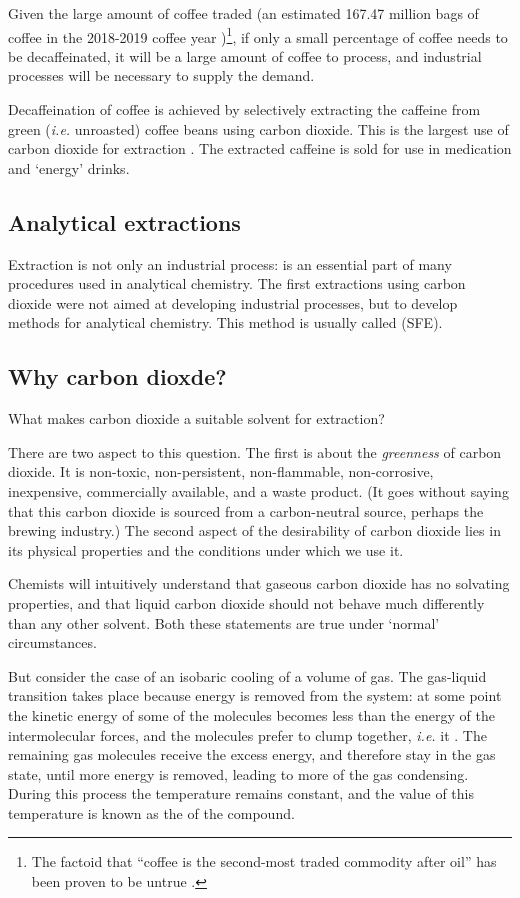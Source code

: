 Given the large amount of coffee traded (an estimated 167.47 million bags of
coffee in the 2018-2019 coffee year \autocite{Coffee2018})\footnote{The factoid
that ``coffee is the second-most traded commodity after oil'' has been proven to
be untrue \autocite{Greenberg2017}.}, if only a small percentage of coffee needs
to be decaffeinated, it will be a large amount of coffee to process, and
industrial processes will be necessary to supply the demand.

Decaffeination of coffee is achieved by selectively extracting the caffeine from
green (\textit{i.e.} unroasted) coffee beans using carbon dioxide. This is the
largest use of carbon dioxide for extraction \autocite{Ramalakshmi1999}. The
extracted caffeine is sold for use in medication and `energy' drinks.

\subsection{Analytical extractions}

Extraction is not only an industrial process: is an essential part of many
procedures used in analytical chemistry. The first extractions using carbon
dioxide were not aimed at developing industrial processes, but to develop
methods for analytical chemistry. This method is usually called
 (SFE).

\subsection{Why carbon dioxde?}

What makes carbon dioxide a suitable solvent for extraction?

There are two aspect to this question. The first is about the \textit{greenness}
of carbon dioxide. It is non-toxic, non-persistent, non-flammable,
non-corrosive, inexpensive, commercially available, and a waste product. (It
goes without saying that this carbon dioxide is sourced from a carbon-neutral
source, perhaps the brewing industry.) The second aspect of the desirability of
carbon dioxide lies in its physical properties and the conditions under which we
use it.

Chemists will intuitively understand that gaseous carbon dioxide has no solvating
properties, and that liquid carbon dioxide should not behave much differently
than any other solvent. Both these statements are true under `normal' circumstances.

But consider the case of an isobaric cooling of a volume of gas. The gas-liquid
transition takes place because energy is removed from the system: at some point
the kinetic energy of some of the molecules becomes less than the energy of the
intermolecular forces, and the molecules prefer to clump together, \textit{i.e.}
it . The remaining gas molecules receive the excess energy,
and therefore stay in the gas state, until more energy is removed, leading to
more of the gas condensing. During this process the temperature remains
constant, and the value of this temperature is known as the  of the compound.

